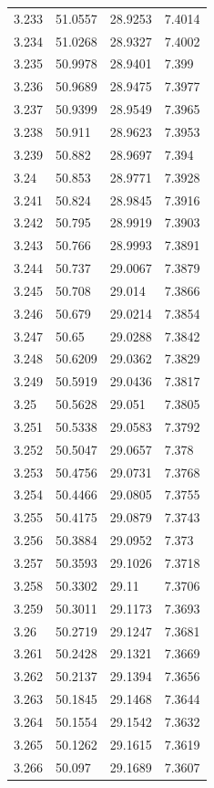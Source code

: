\begin{tabular}{llll}
3.233 & 51.0557 & 28.9253 & 7.4014 \\
3.234 & 51.0268 & 28.9327 & 7.4002 \\
3.235 & 50.9978 & 28.9401 & 7.399 \\
3.236 & 50.9689 & 28.9475 & 7.3977 \\
3.237 & 50.9399 & 28.9549 & 7.3965 \\
3.238 & 50.911 & 28.9623 & 7.3953 \\
3.239 & 50.882 & 28.9697 & 7.394 \\
3.24 & 50.853 & 28.9771 & 7.3928 \\
3.241 & 50.824 & 28.9845 & 7.3916 \\
3.242 & 50.795 & 28.9919 & 7.3903 \\
3.243 & 50.766 & 28.9993 & 7.3891 \\
3.244 & 50.737 & 29.0067 & 7.3879 \\
3.245 & 50.708 & 29.014 & 7.3866 \\
3.246 & 50.679 & 29.0214 & 7.3854 \\
3.247 & 50.65 & 29.0288 & 7.3842 \\
3.248 & 50.6209 & 29.0362 & 7.3829 \\
3.249 & 50.5919 & 29.0436 & 7.3817 \\
3.25 & 50.5628 & 29.051 & 7.3805 \\
3.251 & 50.5338 & 29.0583 & 7.3792 \\
3.252 & 50.5047 & 29.0657 & 7.378 \\
3.253 & 50.4756 & 29.0731 & 7.3768 \\
3.254 & 50.4466 & 29.0805 & 7.3755 \\
3.255 & 50.4175 & 29.0879 & 7.3743 \\
3.256 & 50.3884 & 29.0952 & 7.373 \\
3.257 & 50.3593 & 29.1026 & 7.3718 \\
3.258 & 50.3302 & 29.11 & 7.3706 \\
3.259 & 50.3011 & 29.1173 & 7.3693 \\
3.26 & 50.2719 & 29.1247 & 7.3681 \\
3.261 & 50.2428 & 29.1321 & 7.3669 \\
3.262 & 50.2137 & 29.1394 & 7.3656 \\
3.263 & 50.1845 & 29.1468 & 7.3644 \\
3.264 & 50.1554 & 29.1542 & 7.3632 \\
3.265 & 50.1262 & 29.1615 & 7.3619 \\
3.266 & 50.097 & 29.1689 & 7.3607 \\

\end{tabular}
